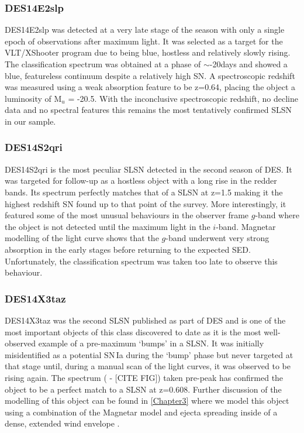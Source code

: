 \subsubsection{DES14E2slp}
DES14E2slp was detected at a very late stage of the season with only a single epoch of observations after maximum light. It was selected as a target for the VLT/XShooter program due to being blue, hostless and relatively slowly rising. The classification spectrum was obtained at a phase of $\sim$-20days and showed a blue, featureless continuum despite a relatively high S\/N. A spectroscopic redshift was measured using a weak absorption feature to be z=0.64, placing the object a luminosity of M$_u$ = -20.5. With the inconclusive spectroscopic redshift, no decline data and no spectral features this remains the most tentatively confirmed SLSN in our sample.

\subsubsection{DES14S2qri}
DES14S2qri is the most peculiar SLSN detected in the second season of DES. It was targeted for follow-up as a hostless object with a long rise in the redder bands. Its spectrum perfectly matches that of a SLSN at z=1.5 making it the highest redshift SN found up to that point of the survey. More interestingly, it featured some of the most unusual behaviours in the observer frame $g$-band where the object is not detected until the maximum light in the $i$-band. Magnetar modelling of the light curve shows that the $g$-band underwent very strong absorption in the early stages before returning to the expected SED. Unfortunately, the classification spectrum was taken too late to observe this behaviour.

\subsubsection{DES14X3taz}
DES14X3taz was the second SLSN published as part of DES and is one of the most important objects of this class discovered to date as it is the most well-observed example of a pre-maximum `bumps' in a SLSN. It was initially misidentified as a potential SN\,Ia during the `bump' phase but never targeted at that stage until, during a manual scan of the light curves, it was observed to be rising again. The spectrum ( - [CITE FIG]) taken pre-peak has confirmed the object to be a perfect match to a SLSN at z=0.608. Further discussion of the modelling of this object can be found in \cref{Chapter3} where we model this object using a combination of the Magnetar model and ejecta spreading inside of a dense, extended wind envelope \citep{Piro2015}.

